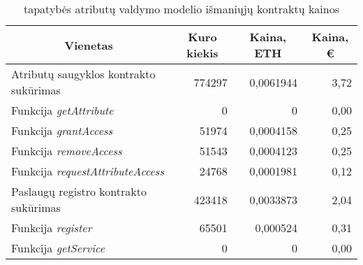 
\begin{table}[H]
    \centering
    \caption{tapatybės atributų valdymo modelio išmaniųjų kontraktų kainos \cite{EthereumGasStation}}
      \begin{tabular}{|l|r|r|r|}
      \hline
      \multicolumn{1}{|c|}{\textbf{Vienetas}} & \multicolumn{1}{c|}{\textbf{Kuro kiekis}} & \multicolumn{1}{c|}{\textbf{Kaina, ETH}} & \multicolumn{1}{c|}{\textbf{Kaina, €}} \bigstrut\\
      \hline
      \multicolumn{1}{|p{16.5em}|}{Atributų saugyklos kontrakto sukūrimas} & 774297 & 0,0061944 & 3,72 \bigstrut[t]\\
      Funkcija \textit{getAttribute} & 0 & 0 & 0,00 \\
      Funkcija \textit{grantAccess} & 51974 & 0,0004158 & 0,25 \\
      Funkcija \textit{removeAccess} & 51543 & 0,0004123 & 0,25 \\
      Funkcija \textit{requestAttributeAccess} & 24768 & 0,0001981 & 0,12 \bigstrut[b]\\
      \hline
      \multicolumn{1}{|p{16.5em}|}{Paslaugų registro kontrakto sukūrimas} & 423418 & 0,0033873 & 2,04 \bigstrut[t]\\
      Funkcija \textit{register} & 65501 & 0,000524 & 0,31 \\
      Funkcija \textit{getService} & 0 & 0 & 0,00 \bigstrut[b]\\
      \hline
      \end{tabular}%
    \label{tab:contractPrices}%
  \end{table}%
  
  
  
  
  